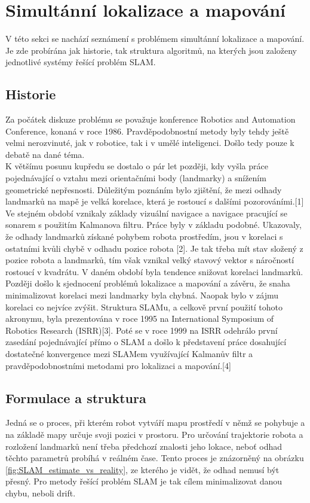 \documentclass[12pt]{report}
\begin{document}
\newpage

\chapter{Simultánní lokalizace a mapování}

V této sekci se nachází seznámení s problémem simultánní lokalizace a mapování. Je zde probírána jak historie, tak struktura algoritmů, na kterých jsou založeny jednotlivé systémy řešící problém SLAM. 

\section{Historie}
Za počátek diskuze problému se považuje konference Robotics and Automation Conference, konaná v roce 1986. Pravděpodobnostní metody byly tehdy ještě velmi nerozvinuté, jak v robotice, tak i v umělé inteligenci. Došlo tedy pouze k debatě na dané téma.\\
\indent K většímu posunu kupředu se dostalo o pár let později, kdy vyšla práce pojednávající o vztahu mezi orientačními body (landmarky) a snížením geometrické nepřesnosti. Důležitým poznáním bylo zjištění, že mezi odhady landmarků na mapě je velká korelace, která je rostoucí s dalšími pozorováními.[1]\\
\indent Ve stejném období vznikaly základy vizuální navigace a navigace pracující se sonarem s použitím Kalmanova filtru. Práce byly v základu podobné. Ukazovaly, že odhady landmarků získané pohybem robota prostředím, jsou v korelaci s ostatními kvůli chybě v odhadu pozice robota [2]. Je tak třeba mít stav složený z pozice robota a landmarků, tím však vznikal velký stavový vektor s náročností rostoucí v kvadrátu. V daném období byla tendence snižovat korelaci landmarků.\\
\indent Později došlo k sjednocení problémů lokalizace a mapování a závěru, že snaha minimalizovat korelaci mezi landmarky byla chybná. Naopak bylo v zájmu korelaci co nejvíce zvýšit. Struktura SLAMu, a celkově první použití tohoto akronymu, byla prezentována v roce 1995 na International Symposium of Robotics Research (ISRR)[3]. Poté se v roce 1999 na ISRR odehrálo první zasedání pojednávající přímo o SLAM a došlo k představení práce dosahující dostatečné konvergence mezi SLAMem využívající Kalmanův filtr a pravděpodobnostními metodami pro lokalizaci a mapování.[4]


\section{Formulace a struktura} 
Jedná se o proces, při kterém robot vytváří mapu prostředí v němž se pohybuje a na základě mapy určuje svoji pozici v prostoru. Pro určování trajektorie robota a rozložení landmarků není třeba předchozí znalosti jeho lokace, neboť odhad těchto parametrů probíhá v reálném čase. Tento proces je znázorněný na obrázku \ref{fig:SLAM_estimate_vs_reality}, ze kterého je vidět, že odhad nemusí být přesný. Pro metody řešící problém SLAM je tak cílem minimalizovat danou chybu, neboli drift.
\end{document}
